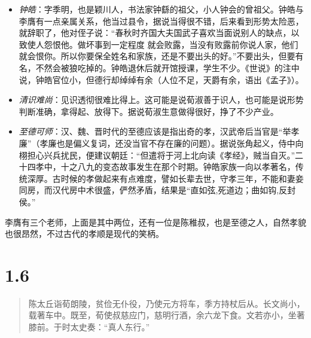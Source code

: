 \documentclass[]{book}
\begin{document}
\begin{itemize}
\item
  \emph{钟皓}：字季明，也是颖川人，书法家钟繇的祖父，小人钟会的曾祖父。钟皓与李膺有一点亲属关系，他当过县令，据说当得很不错，后来看到形势太险恶，就辞职了，他对侄子说：``春秋时齐国大夫国武子喜欢当面说别人的缺点，以致使人怨恨他。做坏事到一定程度
  就会败露，当没有败露前你说人家，他们就会恨你。所以你要保全姓名和家族，还是不要出头的好。''不要出头，但要有名，不然会被狼吃掉的。钟皓退休后就开馆授课，学生不少。《世说》的注中说，钟皓官位小，但德行却绰绰有余（人位不足，天爵有余，语出《孟子》）。
\item
  \emph{清识难尚}：见识透彻很难比得上。这可能是说荀淑善于识人，也可能是说形势判断准确，拿得起、放得下。据说荀淑生意做得很好，挣了不少产业。
\item
  \emph{至德可师}：汉、魏、晋时代的至德应该是指出奇的孝，汉武帝后当官是``举孝廉''（孝廉也是偏义复词，还没当官不存在廉的问题）。据说张角起义，侍中向栩担心兴兵扰民，便建议朝廷：``但遣将于河上北向读《孝经》，贼当自灭。''二十四孝中，十之八九的变态故事发生在那个时期。钟皓家族一向以孝著名，传统深厚。古时候的孝做起来有点难度，譬如长辈去世，守孝三年，不能和妻妾同房，而汉代房中术很盛，俨然矛盾，结果是``直如弦,死道边；曲如钩,反封侯。''
\end{itemize}

李膺有三个老师，上面是其中两位，还有一位是陈稚叔，也是至德之人，自然孝貌也很昂然，不过古代的孝顺是现代的笑柄。

\section{1.6}\label{section-5}

\begin{quote}
陈太丘诣荀朗陵，贫俭无仆役，乃使元方将车，季方持杖后从。长文尚小，载著车中。既至，荀使叔慈应门，慈明行酒，余六龙下食。文若亦小，坐著膝前。于时太史奏：``真人东行。''
\end{quote}
\end{document}
